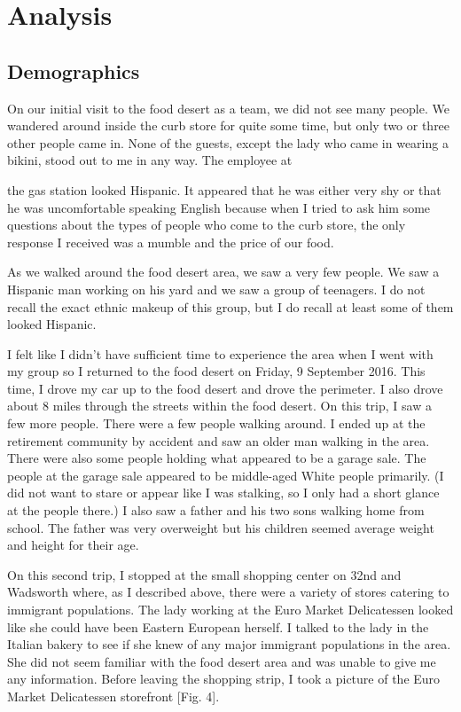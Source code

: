 \documentclass[11pt]{article}
\begin{document}
\section{Analysis}
\subsection{Demographics}
On our initial visit to the food desert as a team, we did not see many people. We wandered around
inside the curb store for quite some time, but only two or three other people came in. None of the
guests, except the lady who came in wearing a bikini, stood out to me in any way. The employee at

the gas station looked Hispanic. It appeared that he was either very shy or that he was
uncomfortable speaking English because when I tried to ask him some questions about the types of
people who come to the curb store, the only response I received was a mumble and the price of our
food.

As we walked around the food desert area, we saw a very few people. We saw a Hispanic man working on
his yard and we saw a group of teenagers. I do not recall the exact ethnic makeup of this group, but
I do recall at least some of them looked Hispanic.

I felt like I didn't have sufficient time to experience the area when I went with my group so I
returned to the food desert on Friday, 9 September 2016. This time, I drove my car up to the food
desert and drove the perimeter. I also drove about 8 miles through the streets within the food
desert. On this trip, I saw a few more people. There were a few people walking around. I ended up at
the retirement community by accident and saw an older man walking in the area. There were also some
people holding what appeared to be a garage sale. The people at the garage sale appeared to be
middle-aged White people primarily. (I did not want to stare or appear like I was stalking, so I
only had a short glance at the people there.) I also saw a father and his two sons walking home from
school. The father was very overweight but his children seemed average weight and height for their
age.

On this second trip, I stopped at the small shopping center on 32nd and Wadsworth where, as I
described above, there were a variety of stores catering to immigrant populations. The lady working
at the Euro Market Delicatessen looked like she could have been Eastern European herself. I
talked to the lady in the Italian bakery to see if she knew of any major immigrant populations in
the area. She did not seem familiar with the food desert area and was unable to give me any
information. Before leaving the shopping strip, I took a picture of the Euro Market Delicatessen
storefront [Fig. 4].
\end{document}
